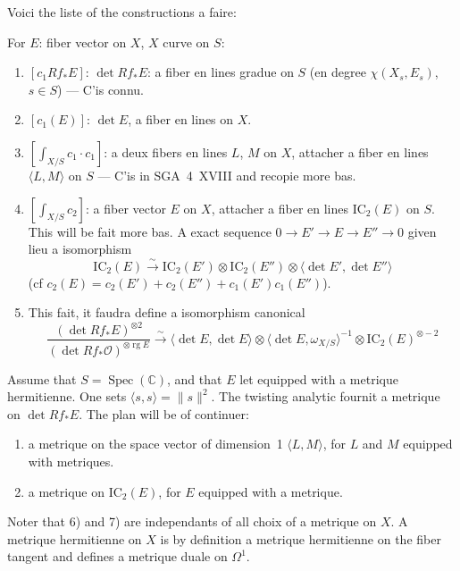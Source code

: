 \documentclass[11pt,a4paper]{article}
\theoremstyle{plain}
\theoremstyle{definition}
\DeclareMathOperator{\Spec}{Spec}
\DeclareMathOperator{\rg}{rg}
\newcommand{\IC}{\mathrm{IC}}
\newcommand{\C}{\mathbb{C}}
\newcommand{\cO}{\mathcal{O}}
\begin{document}
Voici the liste of the constructions a faire:

For $E$: fiber vector on $X$, $X$ curve on $S$:

\begin{enumerate}
\item $[c_1 Rf_* E]$: $\det Rf_* E$: a fiber en lines gradue on $S$ (en degree $\chi(X_s, E_s)$, $s \in S$) --- C'is connu.

\item $[c_1(E)]$: $\det E$, a fiber en lines on $X$.

\item $\left[\int_{X/S} c_1 \cdot c_1\right]$: a deux fibers en lines $L$, $M$ on $X$, attacher a fiber en lines $\langle L, M \rangle$ on $S$ --- C'is in SGA~4~XVIII and recopie more bas.

\item $\left[\int_{X/S} c_2\right]$: a fiber vector $E$ on $X$, attacher a fiber en lines $\IC_2(E)$ on $S$. This will be fait more bas. A exact sequence $0 \to E' \to E \to E'' \to 0$ given lieu a isomorphism
\begin{equation}
\IC_2(E) \xrightarrow{\sim} \IC_2(E') \otimes \IC_2(E'') \otimes \langle \det E', \det E'' \rangle
\end{equation}
(cf $c_2(E) = c_2(E') + c_2(E'') + c_1(E')c_1(E'')$).

\item This fait, it faudra define a isomorphism canonical
\begin{equation}
\frac{(\det Rf_* E)^{\otimes 2}}{(\det Rf_* \cO)^{\otimes \rg E}} \xrightarrow{\sim} \langle \det E, \det E \rangle \otimes \langle \det E, \omega_{X/S} \rangle^{-1} \otimes \IC_2(E)^{\otimes -2}
\end{equation}
\end{enumerate}

Assume that $S = \Spec(\C)$, and that $E$ let equipped with a metrique hermitienne. One sets $\langle s, s \rangle = \|s\|^2$. The twisting analytic fournit a metrique on $\det Rf_* E$. The plan will be of continuer:
\begin{enumerate}
\item[6)] a metrique on the space vector of dimension~1 $\langle L, M \rangle$, for $L$ and $M$ equipped with metriques.
\item[7)] a metrique on $\IC_2(E)$, for $E$ equipped with a metrique.
\end{enumerate}

Noter that 6) and 7) are independants of all choix of a metrique on $X$. A metrique hermitienne on $X$ is by definition a metrique hermitienne on the fiber tangent and defines a metrique duale on $\Omega^1$.
\end{document}
